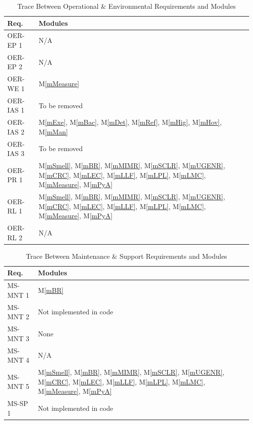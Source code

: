 \documentclass[12pt, titlepage]{article}
\newcommand{\mref}[1]{M\ref{#1}}
\begin{document}
\begin{table}[H]
  \centering
  \begin{tabular}{p{} p{}}
    \toprule \textbf{Req.} & \textbf{Modules}\\
    \midrule
    OER-EP 1 & N/A\\
    OER-EP 2 & N/A\\
    OER-WE 1 & \mref{mMeasure}\\
    OER-IAS 1 & To be removed\\
    OER-IAS 2 & \mref{mExe}, \mref{mBac}, \mref{mDet}, \mref{mRef}, \mref{mHig}, \mref{mHov}, \mref{mMan}\\
    OER-IAS 3 & To be removed\\
    OER-PR 1 & \mref{mSmell}, \mref{mBR}, \mref{mMIMR}, \mref{mSCLR}, \mref{mUGENR}, \mref{mCRC}, \mref{mLEC}, \mref{mLLF}, \mref{mLPL}, \mref{mLMC}, \mref{mMeasure}, \mref{mPyA}\\
    OER-RL 1 & \mref{mSmell}, \mref{mBR}, \mref{mMIMR}, \mref{mSCLR}, \mref{mUGENR}, \mref{mCRC}, \mref{mLEC}, \mref{mLLF}, \mref{mLPL}, \mref{mLMC}, \mref{mMeasure}, \mref{mPyA}\\
    OER-RL 2 & N/A\\
    \bottomrule
  \end{tabular}
  \caption{Trace Between Operational \& Environmental Requirements and Modules}
  \label{tab:OPE-mod}
\end{table}

\begin{table}[H]
  \centering
  \begin{tabular}{p{} p{}}
    \toprule \textbf{Req.} & \textbf{Modules}\\
    \midrule
    MS-MNT 1 & \mref{mBR}\\
    MS-MNT 2 & Not implemented in code\\
    MS-MNT 3 & None \\
    MS-MNT 4 & N/A\\
    MS-MNT 5 & \mref{mSmell}, \mref{mBR}, \mref{mMIMR}, \mref{mSCLR}, \mref{mUGENR}, \mref{mCRC}, \mref{mLEC}, \mref{mLLF}, \mref{mLPL}, \mref{mLMC}, \mref{mMeasure}, \mref{mPyA}\\
    MS-SP 1 & Not implemented in code\\
    \bottomrule
  \end{tabular}
  \caption{Trace Between Maintenance \& Support Requirements and Modules}
  \label{tab:MS-mod}
\end{table}
\end{document}
